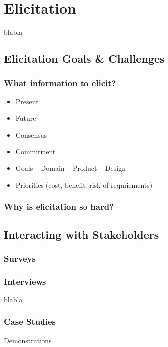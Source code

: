 
\chapter{Elicitation}%
blabla


\section{Elicitation Goals \& Challenges}%

\subsection{What information to elicit?}

\begin{itemize}
  \item Present
  \item Future 
  \item Consensus 
  \item Commitment 
  \item Goals -- Domain -- Product -- Design
  \item Priorities (cost, benefit, risk of requriements)
\end{itemize}

\subsection{Why is elicitation so hard?}

\section{Interacting with Stakeholders}%

\subsection{Surveys}

\subsection{Interviews}

blabla

\subsection{Case Studies}

Demonstrations

